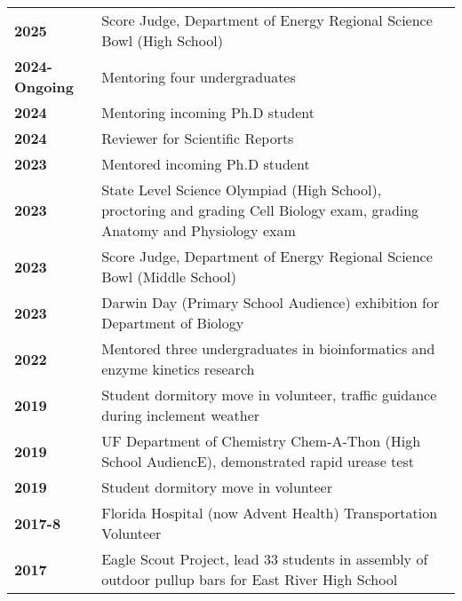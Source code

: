 \documentclass[11pt]{article}
\begin{document}
\section*{\color{secondary}{Service}} 
	\begin{longtable}{p{}p{}}
		\textbf{2025} & {Score Judge, Department of Energy Regional Science Bowl
			(High School)} \\ 
		\textbf{2024-Ongoing} & {Mentoring four undergraduates} \\ 
		\textbf{2024} & {Mentoring incoming Ph.D student} \\ 
		\textbf{2024} & {Reviewer for Scientific Reports} \\ 
		\textbf{2023} & {Mentored incoming Ph.D student} \\ 
		\textbf{2023} & {State Level Science Olympiad (High School), proctoring
		and grading Cell Biology exam, grading Anatomy and Physiology exam} \\ 
		\textbf{2023} & {Score Judge, Department of Energy Regional Science Bowl (Middle School)} \\ 
		\textbf{2023} & {Darwin Day (Primary School Audience) exhibition for Department of Biology} \\
		\textbf{2022} & {Mentored three undergraduates in bioinformatics and enzyme kinetics research} \\
		\textbf{2019} & {Student dormitory move in volunteer, traffic guidance during inclement weather} \\
		\textbf{2019} & {UF Department of Chemistry Chem-A-Thon (High School AudiencE), demonstrated
		rapid urease test} \\ 
		\textbf{2019} & {Student dormitory move in volunteer} \\ 
		\textbf{2017-8} & {Florida Hospital (now Advent Health) Transportation Volunteer} \\ 
		\textbf{2017} & {Eagle Scout Project, lead 33 students in assembly of outdoor pullup
			bars for East River High School } \\ 
	\end{longtable}
\end{document}
